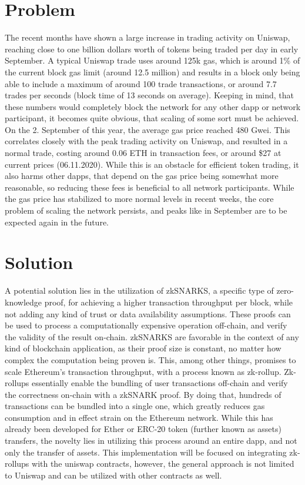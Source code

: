 \documentclass[runningheads]{llncs}
\begin{document}
\section{Problem}
The recent months have shown a large increase in trading activity on Uniswap, reaching close to one billion dollars worth of tokens being traded per day in early September\cite{uniswap_info}. A typical Uniswap trade uses around 125k gas, which is around 1\% of the current block gas limit (around 12.5 million\cite{gaslimit}) and results in a block only being able to include a maximum of around 100 trade transactions, or around 7.7 trades per seconds (block time of 13 seconds on average\cite{blocktime}). Keeping in mind, that these numbers would completely block the network for any other dapp or network participant, it becomes quite obvious, that scaling of some sort must be achieved. On the 2. September of this year, the average gas price reached 480 Gwei\cite{gasprice}. This correlates closely with the peak trading activity on Uniswap, and resulted in a normal trade, costing around 0.06 ETH in transaction fees, or around \$27 at current prices (06.11.2020). While this is an obstacle for efficient token trading, it also harms other dapps, that depend on the gas price being somewhat more reasonable, so reducing these fees is beneficial to all network participants. While the gas price has stabilized to more normal levels in recent weeks, the core problem of scaling the network persists, and peaks like in September are to be expected again in the future.

\section{Solution}
A potential solution lies in the utilization of zkSNARKS\cite{zksnarks_nutshell_2016}, a specific type of zero-knowledge proof, for achieving a higher transaction throughput per block, while not adding any kind of trust or data availability assumptions. These proofs can be used to process a computationally expensive operation off-chain, and verify the validity of the result on-chain.  zkSNARKS are favorable in the context of any kind of blockchain application, as their proof size is constant, no matter how complex the computation being proven is. This, among other things, promises to scale Ethereum's transaction throughput, with a process known as zk-rollup\cite{vbuterin_2018}. Zk-rollups essentially enable the bundling of user transactions off-chain and verify the correctness on-chain with a zkSNARK proof. By doing that, hundreds of transactions can be bundled into a single one, which greatly reduces gas consumption and in effect strain on the Ethereum network. While this has already been developed for Ether or ERC-20 token (further known as assets) transfers, the novelty lies in utilizing this process around an entire dapp, and not only the transfer of assets. This implementation will be focused on integrating zk-rollups with the uniswap contracts, however, the general approach is not limited to Uniswap and can be utilized with other contracts as well.
\end{document}
